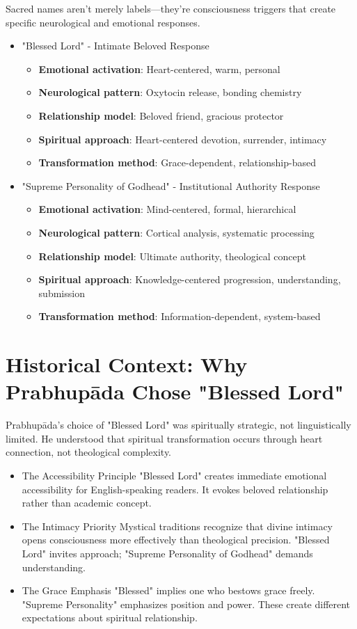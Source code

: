 \documentclass[11pt,twoside]{book}
\begin{document}
Sacred names aren't merely labels—they're consciousness triggers that create specific neurological and emotional responses.
\begin{itemize}
\item "Blessed Lord" - Intimate Beloved Response
\label{sec:org9cc547f}
\begin{itemize}
\item \textbf{\textbf{Emotional activation}}: Heart-centered, warm, personal
\item \textbf{\textbf{Neurological pattern}}: Oxytocin release, bonding chemistry
\item \textbf{\textbf{Relationship model}}: Beloved friend, gracious protector
\item \textbf{\textbf{Spiritual approach}}: Heart-centered devotion, surrender, intimacy
\item \textbf{\textbf{Transformation method}}: Grace-dependent, relationship-based
\end{itemize}
\item "Supreme Personality of Godhead" - Institutional Authority Response
\label{sec:org0eef03e}
\begin{itemize}
\item \textbf{\textbf{Emotional activation}}: Mind-centered, formal, hierarchical
\item \textbf{\textbf{Neurological pattern}}: Cortical analysis, systematic processing
\item \textbf{\textbf{Relationship model}}: Ultimate authority, theological concept
\item \textbf{\textbf{Spiritual approach}}: Knowledge-centered progression, understanding, submission
\item \textbf{\textbf{Transformation method}}: Information-dependent, system-based
\end{itemize}
\end{itemize}
\section*{Historical Context: Why Prabhupāda Chose "Blessed Lord"}
\label{sec:orgc8325d3}

Prabhupāda's choice of "Blessed Lord" was spiritually strategic, not linguistically limited. He understood that spiritual transformation occurs through heart connection, not theological complexity.
\begin{itemize}
\item The Accessibility Principle
\label{sec:org663a75d}
"Blessed Lord" creates immediate emotional accessibility for English-speaking readers. It evokes beloved relationship rather than academic concept.
\item The Intimacy Priority
\label{sec:org771a426}
Mystical traditions recognize that divine intimacy opens consciousness more effectively than theological precision. "Blessed Lord" invites approach; "Supreme Personality of Godhead" demands understanding.
\item The Grace Emphasis
\label{sec:org2c041e1}
"Blessed" implies one who bestows grace freely. "Supreme Personality" emphasizes position and power. These create different expectations about spiritual relationship.
\end{itemize}
\end{document}
